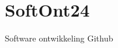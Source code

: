 \chapter{Soft\+Ont24}
\hypertarget{md__r_e_a_d_m_e}{}\label{md__r_e_a_d_m_e}
\label{md__r_e_a_d_m_e_autotoc_md0}%
%
Software ontwikkeling Github 